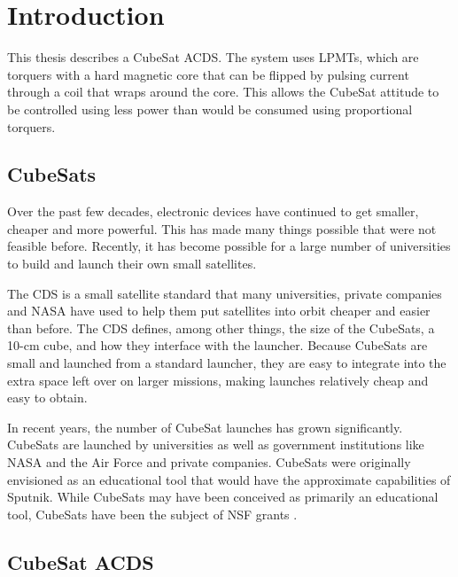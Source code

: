 

\chapter{Introduction}

This thesis describes a CubeSat \ac{ACDS}. The system uses \acfp{LPMT}, which are torquers with a hard magnetic core that can be flipped by pulsing current through a coil that wraps around the core. This allows the CubeSat attitude to be controlled using less power than would be consumed using proportional torquers.

\section{CubeSats}

Over the past few decades, electronic devices have continued to get smaller, cheaper and more powerful. This has made many things possible that were not feasible before. Recently, it has become possible for a large number of universities to build and launch their own small satellites.

The \acf{CDS}\cite{CDS} is a small satellite standard that many universities, private companies and NASA have used to help them put satellites into orbit cheaper and easier than before. The \ac{CDS} defines, among other things, the size of the CubeSats, a 10-cm cube, and how they interface with the launcher. Because CubeSats are small and launched from a standard launcher, they are easy to integrate into the extra space left over on larger missions, making launches relatively cheap and easy to obtain.

In recent years, the number of CubeSat launches has grown significantly. CubeSats are launched by universities as well as government institutions like NASA and the Air Force  and private companies. CubeSats were originally envisioned as an educational tool that would have the approximate capabilities of Sputnik. While CubeSats may have been conceived as primarily an educational tool,  CubeSats have been the subject of \ac{NSF} grants \cite{NSFcube}.

\section{CubeSat \acs*{ACDS}}

